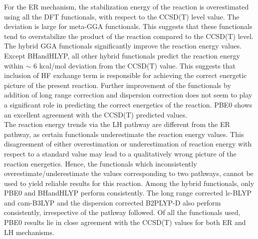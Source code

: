 For the ER mechanism, the stabilization energy of the reaction is overestimated using all the DFT functionals, with respect to the CCSD(T) level value. The deviation is large for meta-GGA functionals. This suggests that these functionals tend to overstabilize the product of the reaction compared to the CCSD(T) level. The hybrid GGA functionals significantly improve the reaction energy values. Except BHandHLYP, all other hybrid functionals predict the reaction energy within $\sim$ 6 kcal/mol deviation from the CCSD(T) value. This suggests that inclusion of HF exchange term is responsible for achieving the correct energetic picture of the present reaction. Further improvement of the functionals by addition of long range correction and dispersion correction does not seem to play a significant role in predicting the correct energetics of the reaction. PBE0 shows an excellent agreement with the CCSD(T) predicted values.\\  
The reaction energy trends via the LH pathway are different from the ER pathway, as certain functionals underestimate the reaction energy values. This disagreement of either overestimation or underestimation of reaction energy with respect to a standard value may lead to a qualitatively wrong picture of the reaction energetics. Hence, the functionals which inconsistently overestimate/underestimate the values corresponding to  two pathways, cannot be used to yield reliable results for this reaction. Among the hybrid functionals, only PBE0 and BHandHLYP perform consistently. The long range corrected lc-BLYP and cam-B3LYP and the dispersion corrected B2PLYP-D also perform consistently, irrespective of the pathway followed. Of all the functionals used, PBE0 results lie in close agreement with the CCSD(T) values for both ER and LH mechanisms.
